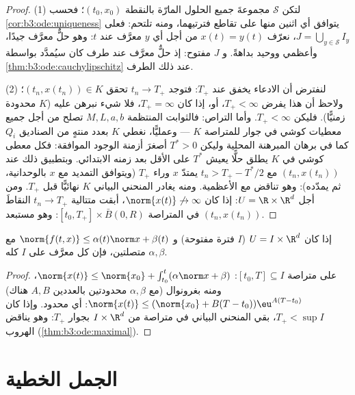 \begin{proof}
(1) لتكن $\mathcal S$ مجموعةَ جميع الحلول المارّة بالنقطة
$(t_0, x_0)$؛ فحسب \cref{cor:b3:ode:uniqueness} يتوافق أي اثنين منها على تقاطع
فترتيهما، ومنه تلتحم: فعلى $J =
\bigcup_{y \in \mathcal S}I_y$، نعرّف $x(t) = y(t)$ من أجل
أي $y$ معرَّف عند $t$: وهو حلٌّ معرَّف جيدًا، وأعظمي ووحيد
بداهةً. و $J$ مفتوح: إذ حلٌّ معرَّف عند طرف كان سيُمدَّد
بواسطة \cref{thm:b3:ode:cauchylipschitz} عند ذلك الطرف.

(2) لنفترض أن الادعاء يخفق عند $T_+$: فتوجد $t_n \to
T_+$ تحقق $(t_n, x(t_n)) \in K$؛
ولاحظ أن هذا يفرض $T_+ <
\infty$، أو، إذا كان $T_+ = \infty$، فلا شيء
نبرهن عليه ($K$ محدودة زمنيًّا). فليكن $T_+ < \infty$. وأما
التراص: فالثوابت المنتظمة $M, L, a,
b$ تصلح من أجل جميع معطيات كوشي
في جوار للمتراصة $K$ --- وعمليًّا، نغطي $K$ بعدد منتهٍ من
الصناديق $Q_i$ كما في برهان المبرهنة المحلية وليكن $T^* > 0$
أصغرَ أزمنة الوجود الموافقة: فكل معطى كوشي في $K$ يطلق حلًّا
يعيش $T^*$ على الأقل بعد زمنه الابتدائي. وبتطبيق ذلك عند
$(t_n, x(t_n))$ مع $t_n > T_+ -
T^*/2$ يمتدّ $x$ وراء $T_+$ (ويتوافق التمديد
مع $x$ بالوحدانية، ثم يمدّده): وهو تناقض مع الأعظمية. ومنه
يغادر المنحني البياني $K$ نهائيًّا قبل $T_+$. ومن أجل $U = \R\times\R^d$:
إذا كان $\norm{x(t)}\not\to\infty$، أبقت متتالية $t_n \to T_+$ النقاطَ
$(t_n, x(t_n))$ في المتراصة $[t_0, T_+]\times\bar B(0, R)$: وهو مستبعد.
\end{proof}

\begin{corollary}
\label{cor:b3:ode:globallinear}
إذا كان $U = I\times\R^d$ ($I$ فترة مفتوحة) و $\norm{f(t, x)}
\leq \alpha(t)\norm x + \beta(t)$ مع $\alpha, \beta$
متصلتين، فإن كل  معرَّف على $I$ كله.
\end{corollary}

\begin{proof}
على متراصة $[t_0, T] \subseteq I$: $\norm{x(t)} \leq
\norm{x_0} + \int_{t_0}^t(\alpha\norm x + \beta)$، ومنه بغرونوال (مع $\alpha, \beta$
محدودتين بالعددين $A, B$ هناك) $\norm{x(t)} \leq (\norm{x_0} + B(T - t_0))\eu^{A(T - t_0)}$: أي محدود. وإذا كان
$T_+ < \sup I$، بقي المنحني البياني في متراصة من $I\times\R^d$
بجوار $T_+$: وهو يناقض الهروب (\cref{thm:b3:ode:maximal}).
\end{proof}

\section{الجمل الخطية}

